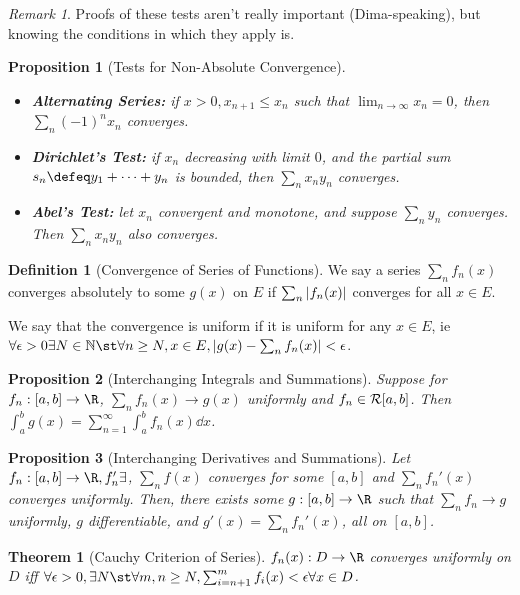 \documentclass[12pt, oneside]{article}
\theoremstyle{definition}
\newtheorem{defn}{Definition}
\theoremstyle{plain}
\newtheorem{thm}{Theorem}
\newtheorem{prop}{Proposition}
\theoremstyle{remark}
\newtheorem{remark}{Remark}
\begin{document}
\begin{remark}
  Proofs of these tests aren't really important (Dima-speaking), but knowing the conditions in which they apply is.
\end{remark}
\begin{prop}[Tests for Non-Absolute Convergence]
  \begin{itemize}
    \item \textbf{Alternating Series:} if $x > 0, x_{n+1} \leq x_n$ such that $\lim_{n \to \infty} x_n = 0$, then $\sum_{n} (-1)^n x_n$ converges.
    \item \textbf{Dirichlet's Test:} if $x_n$ decreasing with limit $0$, and the partial sum $s_n \defeq y_1 + \cdots + y_n$ is bounded, then $\sum_{n} x_n y_n$ converges.
    \item \textbf{Abel's Test:} let $x_n$ convergent and monotone, and suppose $\sum_{n} y_n$ converges. Then $\sum_n x_n y_n$ also converges.
  \end{itemize}
\end{prop}

\begin{defn}[Convergence of Series of Functions]
  We say a series $\sum_n f_n(x)$ converges absolutely to some $g(x)$ on $E$ if $\sum_n \abs{f_n(x)}$ converges for all $x \in E$.

  We say that the convergence is uniform if it is uniform for any $x \in E$, ie $\forall \epsilon > 0 \exists N \in \mathbb{N} \st \forall n \geq N, x \in E, \abs{g(x)- \sum_n f_n(x)} < \epsilon$.
\end{defn}

\begin{prop}[Interchanging Integrals and Summations]
  Suppose for $f_n : [a, b] \to \R$, $\sum_n f_n(x) \to g(x)$ uniformly and $f_n \in \mathcal{R}[a, b]$. Then $\int_a^b g(x) = \sum_{n=1}^\infty \int_a^b f_n(x) \dd{x}$.
\end{prop}

\begin{prop}[Interchanging Derivatives and Summations]
  Let $f_n : [a, b] \to \R, f_n' \exists$, $\sum_{n}f(x)$ converges for some $[a, b]$ and $\sum_n f_n'(x)$ converges uniformly. Then, there exists some $g: [a, b] \to \R$ such that $\sum_n f_n \to g$ uniformly, $g$ differentiable, and $g'(x) = \sum_n f_n'(x)$, all on $[a, b]$.
\end{prop}

\begin{thm}[Cauchy Criterion of Series]
  $f_n(x) : D \to \R$ converges uniformly on $D$ iff $\forall \epsilon > 0, \exists N \st \forall m,n \geq N, \sum_{i=n+1}^m f_i(x) < \epsilon \forall x \in D$.
\end{thm}
\end{document}
